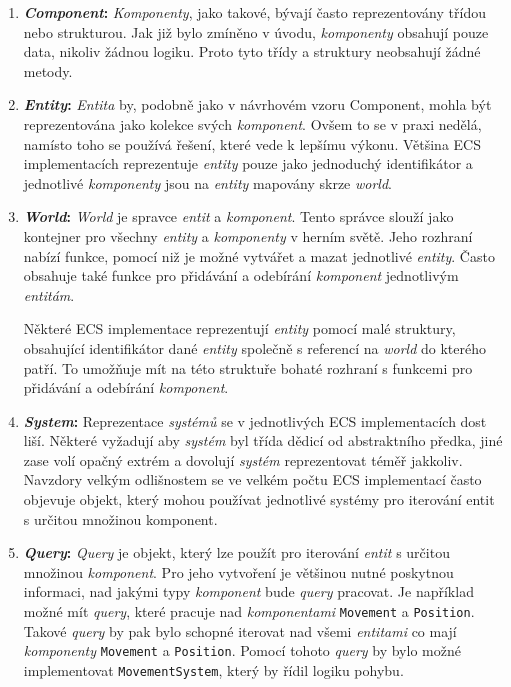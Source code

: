 \begin{enumerate}
    \item \textbf{\textit{Component}:} \textit{Komponenty}, jako takové, bývají často reprezentovány třídou nebo strukturou. Jak již bylo zmíněno v úvodu, \textit{komponenty} obsahují pouze data, nikoliv žádnou logiku. Proto tyto třídy a struktury neobsahují žádné metody.

    \item \textbf{\textit{Entity}:} \textit{Entita} by, podobně jako v návrhovém vzoru Component, mohla být reprezentována jako kolekce svých \textit{komponent}. Ovšem to se v praxi nedělá, namísto toho se používá řešení, které vede k lepšímu výkonu. Většina ECS implementacích reprezentuje \textit{entity} pouze jako jednoduchý identifikátor a jednotlivé \textit{komponenty} jsou na \textit{entity} mapovány skrze \textit{world}.

    \item \textbf{\textit{World}:} \textit{World} je spravce \textit{entit} a \textit{komponent}. Tento správce slouží jako kontejner pro všechny \textit{entity} a \textit{komponenty} v herním světě. Jeho rozhraní nabízí funkce, pomocí niž je možné vytvářet a mazat jednotlivé \textit{entity}. Často obsahuje také funkce pro přidávání a odebírání \textit{komponent} jednotlivým \textit{entitám}.

    Některé ECS implementace reprezentují \textit{entity} pomocí malé struktury, obsahující identifikátor dané \textit{entity} společně s referencí na \textit{world} do kterého patří. To umožňuje mít na této struktuře bohaté rozhraní s funkcemi pro přidávání a odebírání \textit{komponent}.

    \item \textbf{\textit{System}:} Reprezentace \textit{systémů} se v jednotlivých ECS implementacích dost liší. Některé vyžadují aby \textit{systém} byl třída dědicí od abstraktního předka, jiné zase volí opačný extrém a dovolují \textit{systém} reprezentovat téměř jakkoliv. Navzdory velkým odlišnostem se ve velkém počtu ECS implementací často objevuje objekt, který mohou používat jednotlivé systémy pro iterování entit s určitou množinou komponent.

    \item \textbf{\textit{Query}:} \textit{Query} je objekt, který lze použít pro iterování \textit{entit} s určitou množinou \textit{komponent}. Pro jeho vytvoření je většinou nutné poskytnou informaci, nad jakými typy \textit{komponent} bude \textit{query} pracovat. Je například možné mít \textit{query}, které pracuje nad \textit{komponentami} \verb|Movement| a \verb|Position|. Takové \textit{query} by pak bylo schopné iterovat nad všemi \textit{entitami} co mají \textit{komponenty} \verb|Movement| a \verb|Position|. Pomocí tohoto \textit{query} by bylo možné implementovat \verb|MovementSystem|, který by řídil logiku pohybu.
\end{enumerate}

